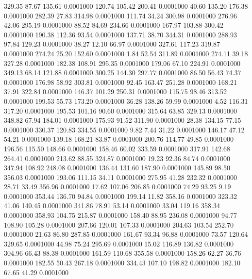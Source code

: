  329.35   87.67  135.61   0.0001000
 120.74  105.42  200.41   0.0001000
  40.60  135.20  176.38   0.0001000
 282.39   27.83  314.98   0.0001000
 111.74   34.24  300.98   0.0001000
 276.96   42.06  295.19   0.0001000
  88.52   84.69  234.66   0.0001000
 167.97  103.88  300.42   0.0001000
 190.38  112.36   93.54   0.0001000
 137.71   38.70  344.31   0.0001000
 288.93   97.84  129.23   0.0001000
  38.27   12.10   66.97   0.0001000
 327.61  117.23  319.87   0.0001000
 274.24   25.20  152.60   0.0001000
   1.84   52.54  311.89   0.0001000
 274.11   39.18  327.28   0.0001000
 182.38  108.91  295.35   0.0001000
 179.06   67.10  224.91   0.0001000
 349.13   68.14  121.88   0.0001000
 300.25  144.30  297.77   0.0001000
  86.50   56.43   74.37   0.0001000
 176.98   58.92  303.81   0.0001000
  92.45  163.47  251.28   0.0001000
 168.21   37.91  322.84   0.0001000
 146.37  101.29  250.31   0.0001000
 115.75   98.46  313.52   0.0001000
 199.53   55.73  173.20   0.0001000
  36.28  138.26   59.99   0.0001000
   4.52  116.31  317.20   0.0001000
 195.53  101.16   90.60   0.0001000
 315.64   63.85  329.13   0.0001000
 348.82   67.94  184.01   0.0001000
 175.93   91.52  311.90   0.0001000
  28.38  134.15   77.15   0.0001000
 330.37  120.83  334.55   0.0001000
   9.82    7.44   31.22   0.0001000
 146.17   47.12   54.21   0.0001000
 139.18  168.21   83.87   0.0001000
 200.76  114.77   49.85   0.0001000
 196.56  115.50  148.66   0.0001000
 158.46   60.02  333.59   0.0001000
 317.91  142.68  264.41   0.0001000
 213.62   88.55  324.87   0.0001000
  19.23   92.36   84.74   0.0001000
 347.94  108.92  248.08   0.0001000
 136.44  131.60  187.90   0.0001000
 145.89   98.50  356.03   0.0001000
 193.06  111.15   34.11   0.0001000
 275.95   41.28  232.32   0.0001000
  28.71   33.49  356.96   0.0001000
  17.62  107.06  206.85   0.0001000
  74.29   93.25    9.19   0.0001000
 353.44  136.70   94.84   0.0001000
 199.14   11.82  358.16   0.0001000
 323.32   41.06  140.45   0.0001000
 341.86   78.91   53.14   0.0001000
  33.04  119.16  358.34   0.0001000
 358.93  104.75  215.87   0.0001000
 158.40   88.95  236.08   0.0001000
  94.77  108.90  105.28   0.0001000
 207.66  120.01  107.33   0.0001000
 204.63  103.54  252.70   0.0001000
  21.63   86.80  287.85   0.0001000
 161.67   93.34   96.88   0.0001000
  73.57  120.64  329.65   0.0001000
  44.98   75.24  295.69   0.0001000
  15.02  116.89  136.82   0.0001000
 304.96   66.43   88.38   0.0001000
 161.59  110.68  355.58   0.0001000
 158.26   62.27   36.76   0.0001000
 182.55   50.43  267.18   0.0001000
 334.43  107.10  198.82   0.0001000
 182.10   67.65   41.29   0.0001000
